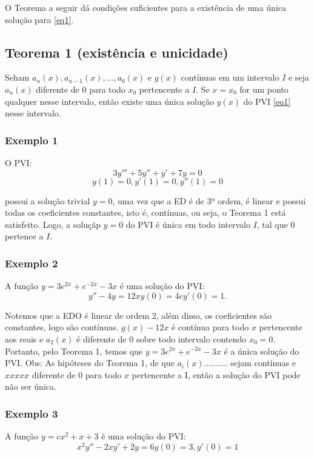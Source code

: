 \documentclass[
	article,			%
	11pt,				%
	oneside,			%
	a4paper,			%
	english,			%
	brazil,				%
	sumario=tradicional
	]{abntex2}
\begin{document}
O Teorema a seguir dá condições suficientes para a existência de uma única solução para \eqref{eq1}.

\subsection{Teorema 1 (existência e unicidade)}
Seham $a_{n}(x), a_{n-1}(x), ... , a_{0}(x)$ e $g(x)$ contínuas em um intervalo $I$ e seja $a_{n}(x)$ diferente de $0$ para todo $x_{0}$ pertencente a $I$.
Se $x = x_{0}$ for um ponto qualquer nesse intervalo, então existe uma única solução $y(x)$ do PVI \eqref{eq1} nesse intervalo.

\subsubsection{Exemplo 1}
O PVI:
\begin{equation}\label{exemplo1}
3y''' + 5y'' + y' + 7y = 0
\end{equation} 
\begin{equation}\label{exemplo1.2}
y(1) = 0, y'(1) = 0, y''(1) = 0
\end{equation}

possui a solução trivial $y=0$, uma vez que a ED é de 3º ordem, é linear e possui todas os coeficientes constantes, isto é, contínuas, ou seja, o Teorema 1 está satisfeito. Logo, a soluçãp $y = 0 $ do PVI é única em todo intervalo $I$, tal que 0 pertence a $I$.

\subsubsection{Exemplo 2}
A função $y=3e^{2x}+ e^{-2x} -3x$ é uma solução do PVI:
\begin{equation}\label{key}
y'' - 4y = 12x
y(0) = 4 e y'(0) = 1.
\end{equation}

Notemos que a EDO é linear de ordem 2, além disso, os coeficientes são constantes, logo são contínuas. $g(x) - 12x$ é contínua para todo $x$ pertencente aos reais e $a_{2}(x)$ é diferente de 0 sobre todo intervalo contendo $x_{0} = 0$.
Portanto, pelo Teorema 1, temos que $y=3e^{2x} + e^{-2x} -3x$ é a única solução do PVI.
Obs: As hipóteses do Teorema 1, de que $a_{i}(x)..........$ sejam contínuas e $xxxxx$ diferente de 0 para todo $x$ pertencente a I, então a solução do PVI pode não ser única.

\subsubsection{Exemplo 3}
A função $y = cx^{2} + x + 3$ é uma solução do PVI:
\begin{equation*}\label{ex3}
x^{2}y'' - 2xy' +2y = 6
y(0) = 3, y'(0) = 1
\end{equation*}
\end{document}
